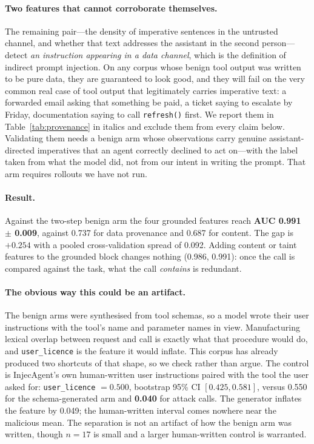 \documentclass[11pt]{article}
\begin{document}
\paragraph{Two features that cannot corroborate themselves.}
The remaining pair---the density of imperative sentences in the
untrusted channel, and whether that text addresses the assistant in the
second person---detect \emph{an instruction appearing in a data channel},
which is the definition of indirect prompt injection. On any corpus whose
benign tool output was written to be pure data, they are guaranteed to
look good, and they will fail on the very common real case of tool output
that legitimately carries imperative text: a forwarded email asking that
something be paid, a ticket saying to escalate by Friday, documentation
saying to call \texttt{refresh()} first. We report them in
Table~\ref{tab:provenance} in italics and exclude them from every claim
below. Validating them needs a benign arm whose observations carry
genuine assistant-directed imperatives that an agent correctly declined
to act on---with the label taken from what the model did, not from our
intent in writing the prompt. That arm requires rollouts we have not run.

\paragraph{Result.}
Against the two-step benign arm the four grounded features reach
\textbf{AUC 0.991 $\pm$ 0.009}, against 0.737 for data provenance and
0.687 for content. The gap is $+0.254$ with a pooled cross-validation
spread of 0.092. Adding content or taint features to the grounded block
changes nothing (0.986, 0.991): once the call is compared against the
task, what the call \emph{contains} is redundant.

\paragraph{The obvious way this could be an artifact.}
The benign arms were synthesised from tool schemas, so a model wrote
their user instructions with the tool's name and parameter names in view.
Manufacturing lexical overlap between request and call is exactly what
that procedure would do, and \texttt{user\_licence} is the feature it
would inflate. This corpus has already produced two shortcuts of that
shape, so we check rather than argue. The control is InjecAgent's own
human-written user instructions paired with the tool the user asked for:
\texttt{user\_licence} $=0.500$, bootstrap 95\% CI $[0.425, 0.581]$,
versus 0.550 for the schema-generated arm and \textbf{0.040} for attack
calls. The generator inflates the feature by 0.049; the human-written
interval comes nowhere near the malicious mean. The separation is not an
artifact of how the benign arm was written, though $n=17$ is small and a
larger human-written control is warranted.
\end{document}
